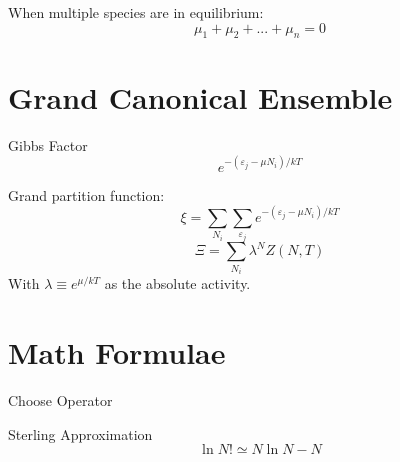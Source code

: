 \documentclass[11pt]{article}
\begin{document}
When multiple species are in equilibrium:
\begin{equation}
    \mu_1 + \mu_2 + ... + \mu_n = 0
\end{equation}


\section{Grand Canonical Ensemble}
Gibbs Factor
\begin{equation}
    e^{-(\varepsilon_j - \mu N_i) / kT}
\end{equation}

Grand partition function:
\begin{equation}
    \xi = \sum_{N_i} \sum_{\varepsilon_j} e^{-(\varepsilon_j - \mu N_i) / kT}
\end{equation}
\begin{equation}
    \Xi = \sum_{N_i} \lambda^N Z(N, T)
\end{equation}
With $\lambda \equiv e^{\mu / kT}$ as the absolute activity.



\section{Math Formulae}
Choose Operator
\Nchoosen

Sterling Approximation
\begin{equation}
    \ln N ! \simeq N \ln N - N
\end{equation}
\end{document}
